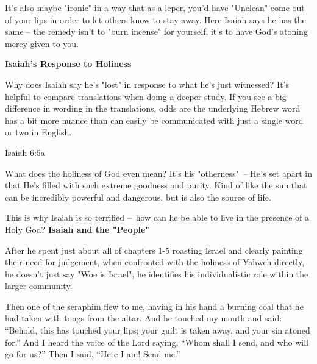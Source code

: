 \documentclass[11pt]{article}
\begin{document}
{\vspace{1em}}
It's also maybe "ironic" in a way that as a leper, you'd have "Unclean" come out of your lips in order to let others know to stay away. Here Isaiah says he has the same – the remedy isn't to "burn incense" for yourself, it's to have God's atoning mercy given to you.

{\vspace{3em}}
{\large\bfseries Isaiah's Response to Holiness}
{\vspace{1em}}

Why does Isaiah say he's "lost" in response to what he's just witnessed? It's helpful to compare translations when doing a deeper study.
If you see a big difference in wording in the translations, odds are the underlying Hebrew word has a bit more nuance than can easily be communicated with just a single word or two in English.
\begin{biblecomparison}{Isaiah 6:5a}
\end{biblecomparison}


What does the holiness of God even mean? It's his "otherness" – He's set apart in that He's filled with such extreme goodness and purity. Kind of like the sun that can be incredibly powerful and dangerous, but is also the source of life.

This is why Isaiah is so terrified – how can he be able to live in the presence of a Holy God?
\newpage
{\large\bfseries Isaiah and the "People"}
{\vspace{1em}}

After he spent just about all of chapters 1-5 roasting Israel and clearly painting their need for judgement, when confronted with the holiness of Yahweh directly, he doesn't just say "Woe is Israel", he identifies his individualistic role within the larger community.
\newpage

\begin{biblicaloutline}[Isaiah 6:6-8]
    
         Then one of the seraphim flew to me, having in his hand a burning coal that he had taken with tongs from the altar.
         And he touched my mouth and said: ``Behold, this has touched your lips; your guilt is taken away, and your sin atoned for.''
          And I heard the voice of the Lord saying, ``Whom shall I send, and who will go for us?'' Then I said, ``Here I am! Send me.''

\end{biblicaloutline}
\end{document}
